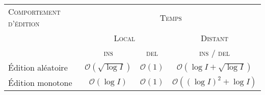 
\small
\begin{tabularx}{1\textwidth}{@{}Xcccc@{}}
  \toprule
  \textsc{Comportement d'édition} & \multicolumn{4}{c}{\textsc{Temps}} \\
    & \multicolumn{2}{c}{\textsc{Local}} & \multicolumn{2}{c}{\textsc{Distant}} \\ \cmidrule(r){2-3} \cmidrule(l){4-5}
  & \textsc{ins} & \textsc{del} & \multicolumn{2}{c}{\textsc{ins} / \textsc{del}}  \\ \midrule
  Édition aléatoire & $\mathcal{O}(\sqrt{\log I})$ & $\mathcal{O}(1)$ & \multicolumn{2}{c}{$\mathcal{O}(\log I + \sqrt{\log I})$} \\
  Édition monotone & $\mathcal{O}(\log I)$ & $\mathcal{O}(1)$ & \multicolumn{2}{c}{$\mathcal{O}((\log I)^2 +\log I)$} \\ \bottomrule
\end{tabularx}


